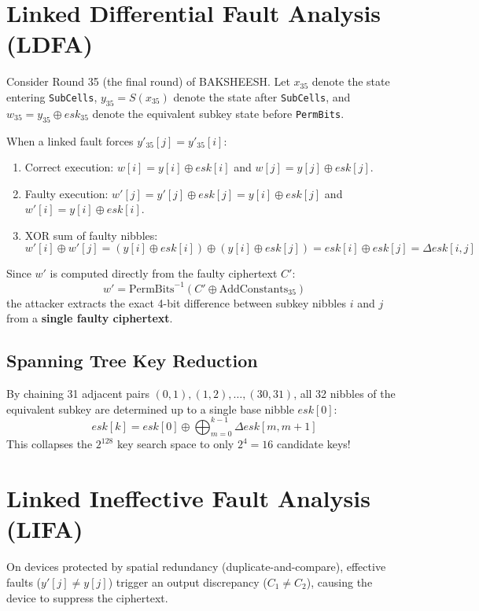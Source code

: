 \documentclass[12pt,a4paper,oneside]{report}
\begin{document}
\section{Linked Differential Fault Analysis (LDFA)}
\label{sec:ldfa_math}
Consider Round 35 (the final round) of BAKSHEESH. Let $x_{35}$ denote the state entering \texttt{SubCells}, $y_{35} = S(x_{35})$ denote the state after \texttt{SubCells}, and $w_{35} = y_{35} \oplus esk_{35}$ denote the equivalent subkey state before \texttt{PermBits}.

When a linked fault forces $y'_{35}[j] = y'_{35}[i]$:
\begin{enumerate}
    \item Correct execution: $w[i] = y[i] \oplus esk[i]$ and $w[j] = y[j] \oplus esk[j]$.
    \item Faulty execution: $w'[j] = y'[j] \oplus esk[j] = y[i] \oplus esk[j]$ and $w'[i] = y[i] \oplus esk[i]$.
    \item XOR sum of faulty nibbles:
    \begin{equation}
        w'[i] \oplus w'[j] = (y[i] \oplus esk[i]) \oplus (y[i] \oplus esk[j]) = esk[i] \oplus esk[j] = \Delta esk[i, j]
    \end{equation}
\end{enumerate}

Since $w'$ is computed directly from the faulty ciphertext $C'$:
\begin{equation}
    w' = \text{PermBits}^{-1}(C' \oplus \text{AddConstants}_{35})
\end{equation}
the attacker extracts the exact 4-bit difference between subkey nibbles $i$ and $j$ from a \textbf{single faulty ciphertext}.

\subsection{Spanning Tree Key Reduction}
By chaining 31 adjacent pairs $(0, 1), (1, 2), \dots, (30, 31)$, all 32 nibbles of the equivalent subkey are determined up to a single base nibble $esk[0]$:
\begin{equation}
    esk[k] = esk[0] \oplus \bigoplus_{m=0}^{k-1} \Delta esk[m, m+1]
\end{equation}
This collapses the $2^{128}$ key search space to only $2^4 = 16$ candidate keys!

\section{Linked Ineffective Fault Analysis (LIFA)}
\label{sec:lifa_math}
On devices protected by spatial redundancy (duplicate-and-compare), effective faults ($y'[j] \neq y[j]$) trigger an output discrepancy ($C_1 \neq C_2$), causing the device to suppress the ciphertext.
\end{document}
